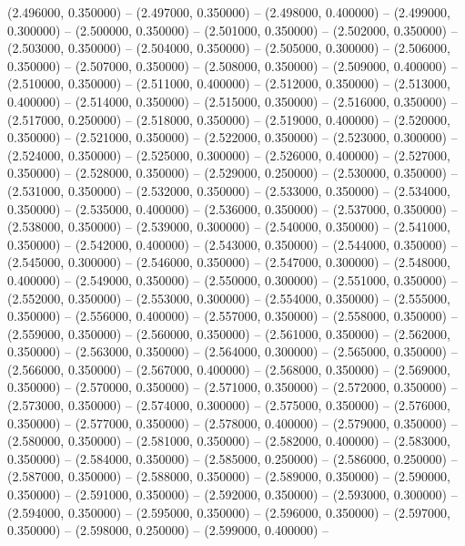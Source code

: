 (2.496000, 0.350000) -- 
(2.497000, 0.350000) -- 
(2.498000, 0.400000) -- 
(2.499000, 0.300000) -- 
(2.500000, 0.350000) -- 
(2.501000, 0.350000) -- 
(2.502000, 0.350000) -- 
(2.503000, 0.350000) -- 
(2.504000, 0.350000) -- 
(2.505000, 0.300000) -- 
(2.506000, 0.350000) -- 
(2.507000, 0.350000) -- 
(2.508000, 0.350000) -- 
(2.509000, 0.400000) -- 
(2.510000, 0.350000) -- 
(2.511000, 0.400000) -- 
(2.512000, 0.350000) -- 
(2.513000, 0.400000) -- 
(2.514000, 0.350000) -- 
(2.515000, 0.350000) -- 
(2.516000, 0.350000) -- 
(2.517000, 0.250000) -- 
(2.518000, 0.350000) -- 
(2.519000, 0.400000) -- 
(2.520000, 0.350000) -- 
(2.521000, 0.350000) -- 
(2.522000, 0.350000) -- 
(2.523000, 0.300000) -- 
(2.524000, 0.350000) -- 
(2.525000, 0.300000) -- 
(2.526000, 0.400000) -- 
(2.527000, 0.350000) -- 
(2.528000, 0.350000) -- 
(2.529000, 0.250000) -- 
(2.530000, 0.350000) -- 
(2.531000, 0.350000) -- 
(2.532000, 0.350000) -- 
(2.533000, 0.350000) -- 
(2.534000, 0.350000) -- 
(2.535000, 0.400000) -- 
(2.536000, 0.350000) -- 
(2.537000, 0.350000) -- 
(2.538000, 0.350000) -- 
(2.539000, 0.300000) -- 
(2.540000, 0.350000) -- 
(2.541000, 0.350000) -- 
(2.542000, 0.400000) -- 
(2.543000, 0.350000) -- 
(2.544000, 0.350000) -- 
(2.545000, 0.300000) -- 
(2.546000, 0.350000) -- 
(2.547000, 0.300000) -- 
(2.548000, 0.400000) -- 
(2.549000, 0.350000) -- 
(2.550000, 0.300000) -- 
(2.551000, 0.350000) -- 
(2.552000, 0.350000) -- 
(2.553000, 0.300000) -- 
(2.554000, 0.350000) -- 
(2.555000, 0.350000) -- 
(2.556000, 0.400000) -- 
(2.557000, 0.350000) -- 
(2.558000, 0.350000) -- 
(2.559000, 0.350000) -- 
(2.560000, 0.350000) -- 
(2.561000, 0.350000) -- 
(2.562000, 0.350000) -- 
(2.563000, 0.350000) -- 
(2.564000, 0.300000) -- 
(2.565000, 0.350000) -- 
(2.566000, 0.350000) -- 
(2.567000, 0.400000) -- 
(2.568000, 0.350000) -- 
(2.569000, 0.350000) -- 
(2.570000, 0.350000) -- 
(2.571000, 0.350000) -- 
(2.572000, 0.350000) -- 
(2.573000, 0.350000) -- 
(2.574000, 0.300000) -- 
(2.575000, 0.350000) -- 
(2.576000, 0.350000) -- 
(2.577000, 0.350000) -- 
(2.578000, 0.400000) -- 
(2.579000, 0.350000) -- 
(2.580000, 0.350000) -- 
(2.581000, 0.350000) -- 
(2.582000, 0.400000) -- 
(2.583000, 0.350000) -- 
(2.584000, 0.350000) -- 
(2.585000, 0.250000) -- 
(2.586000, 0.250000) -- 
(2.587000, 0.350000) -- 
(2.588000, 0.350000) -- 
(2.589000, 0.350000) -- 
(2.590000, 0.350000) -- 
(2.591000, 0.350000) -- 
(2.592000, 0.350000) -- 
(2.593000, 0.300000) -- 
(2.594000, 0.350000) -- 
(2.595000, 0.350000) -- 
(2.596000, 0.350000) -- 
(2.597000, 0.350000) -- 
(2.598000, 0.250000) -- 
(2.599000, 0.400000) -- 
